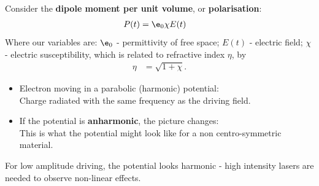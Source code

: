 \documentclass[a4paper, 11pt, normalem]{report}
\begin{document}
Consider the \textbf{dipole moment per unit volume}, or \textbf{polarisation}:
\begin{align}
    P(t) &= \e_0\chi E(t)
\end{align}
Where our variables are: $\e_0$ - permittivity of free space; $E(t)$ - electric field; $\chi$ - electric susceptibility, which is related to refractive index $\eta$, by
\begin{align}
    \eta &= \sqrt{1+\chi}.
\end{align}
\begin{itemize}
    \item Electron moving in a parabolic (harmonic) potential:\\
        Charge radiated with the same frequency as the driving field.
        \begin{figure}[H]
            \centering
        \end{figure}
    \item If the potential is \textbf{anharmonic}, the picture changes:\\
        This is what the potential might look like for a non centro-symmetric material.
        \begin{figure}[H]
            \centering
        \end{figure}
\end{itemize}
For low amplitude driving, the potential looks harmonic - high intensity lasers are needed to observe non-linear effects.
\end{document}
